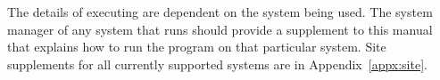 The details of executing \caps{\PROGRAM} are dependent on the system
being used. The system manager of any system that runs \caps{\PROGRAM}
should provide a supplement to this manual that explains how to run the
program on that particular system. Site supplements for all currently
supported systems are in Appendix~\ref{appx:site}.
